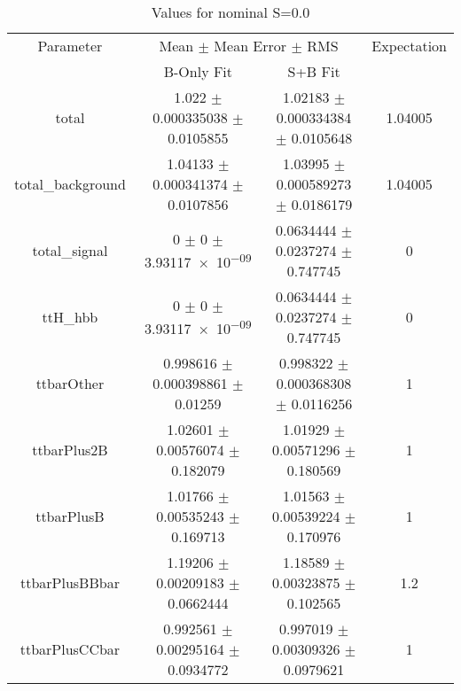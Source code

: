 \begin{table}
\centering
\caption{Values for nominal S=0.0}
\begin{tabular}{cccc}
\toprule
Parameter & \multicolumn{2}{c}{Mean $\pm$ Mean Error $\pm$ RMS} & Expectation\\
 & B-Only Fit & S+B Fit & \\
\midrule
total & \num{1.022} $\pm$ \num{0.000335038} $\pm$ \num{0.0105855} & \num{1.02183} $\pm$ \num{0.000334384} $\pm$ \num{0.0105648} & \num{1.04005}\\
total\_background & \num{1.04133} $\pm$ \num{0.000341374} $\pm$ \num{0.0107856} & \num{1.03995} $\pm$ \num{0.000589273} $\pm$ \num{0.0186179} & \num{1.04005}\\
total\_signal & \num{0} $\pm$ \num{0} $\pm$ \num{3.93117e-09} & \num{0.0634444} $\pm$ \num{0.0237274} $\pm$ \num{0.747745} & \num{0}\\
ttH\_hbb & \num{0} $\pm$ \num{0} $\pm$ \num{3.93117e-09} & \num{0.0634444} $\pm$ \num{0.0237274} $\pm$ \num{0.747745} & \num{0}\\
ttbarOther & \num{0.998616} $\pm$ \num{0.000398861} $\pm$ \num{0.01259} & \num{0.998322} $\pm$ \num{0.000368308} $\pm$ \num{0.0116256} & \num{1}\\
ttbarPlus2B & \num{1.02601} $\pm$ \num{0.00576074} $\pm$ \num{0.182079} & \num{1.01929} $\pm$ \num{0.00571296} $\pm$ \num{0.180569} & \num{1}\\
ttbarPlusB & \num{1.01766} $\pm$ \num{0.00535243} $\pm$ \num{0.169713} & \num{1.01563} $\pm$ \num{0.00539224} $\pm$ \num{0.170976} & \num{1}\\
ttbarPlusBBbar & \num{1.19206} $\pm$ \num{0.00209183} $\pm$ \num{0.0662444} & \num{1.18589} $\pm$ \num{0.00323875} $\pm$ \num{0.102565} & \num{1.2}\\
ttbarPlusCCbar & \num{0.992561} $\pm$ \num{0.00295164} $\pm$ \num{0.0934772} & \num{0.997019} $\pm$ \num{0.00309326} $\pm$ \num{0.0979621} & \num{1}\\
\bottomrule
\end{tabular}
\end{table}